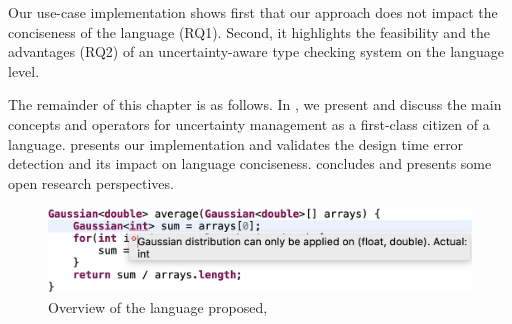 Our use-case implementation shows first that our approach does not impact the conciseness of the language (RQ1).
Second, it highlights the feasibility and the advantages (RQ2) of an uncertainty-aware type checking system on the language level.

The remainder of this chapter is as follows.
In , we present and discuss the main concepts and operators for uncertainty management as a first-class citizen of a language. 
 presents our \langName{} implementation and validates the design time error detection and its impact on language conciseness. 
 concludes and presents some open research perspectives. 


\begin{figure}
	\centering
	\includegraphics[width=\linewidth]{img/chapt-aintea/intro/aintea-overview}
	\caption{Overview of the language proposed, \langName{}}
	\label{fig:motivation-aintea-overview}
\end{figure}